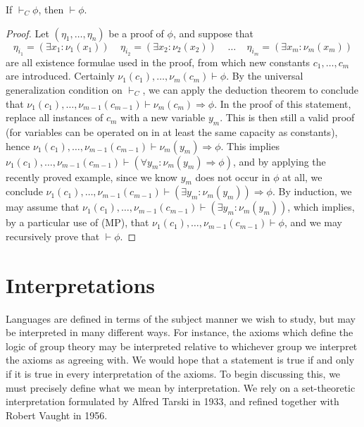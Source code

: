 \begin{theorem}
    If $\vdash_C \phi$, then $\vdash \phi$.
\end{theorem}
\begin{proof}
    Let $(\eta_1, \dots, \eta_n)$ be a proof of $\phi$, and suppose that
    \[ \eta_{i_1} = (\exists x_1: \nu_1(x_1))\ \ \ \ \ \eta_{i_2} = (\exists x_2: \nu_2(x_2))\ \ \ \ \ \dots\ \ \ \ \ \eta_{i_m} = (\exists x_m: \nu_m(x_m)) \]
    are all existence formulae used in the proof, from which new constants $c_1, \dots, c_m$ are introduced. Certainly $\nu_1(c_1), \dots, \nu_m(c_m) \vdash \phi$. By the universal generalization condition on $\vdash_C$, we can apply the deduction theorem to conclude that $\nu_1(c_1), \dots, \nu_{m-1}(c_{m-1}) \vdash \nu_m(c_m) \Rightarrow \phi$. In the proof of this statement, replace all instances of $c_m$ with a new variable $y_m$. This is then still a valid proof (for variables can be operated on in at least the same capacity as constants), hence $\nu_1(c_1), \dots, \nu_{m-1}(c_{m-1}) \vdash \nu_m(y_m) \Rightarrow \phi$. This implies $\nu_1(c_1), \dots, \nu_{m-1}(c_{m-1}) \vdash (\forall y_m: \nu_m(y_m) \Rightarrow \phi)$, and by applying the recently proved example, since we know $y_m$ does not occur in $\phi$ at all, we conclude $\nu_1(c_1), \dots, \nu_{m-1}(c_{m-1}) \vdash (\exists y_m: \nu_m(y_m)) \Rightarrow \phi$. By induction, we may assume that $\nu_1(c_1), \dots, \nu_{m-1}(c_{m-1}) \vdash (\exists y_m: \nu_m(y_m))$, which implies, by a particular use of (MP), that $\nu_1(c_1), \dots, \nu_{m-1}(c_{m-1}) \vdash \phi$, and we may recursively prove that $\vdash \phi$.
\end{proof}







\section{Interpretations}

Languages are defined in terms of the subject manner we wish to study, but may be interpreted in many different ways. For instance, the axioms which define the logic of group theory may be interpreted relative to whichever group we interpret the axioms as agreeing with. We would hope that a statement is true if and only if it is true in every interpretation of the axioms. To begin discussing this, we must precisely define what we mean by interpretation. We rely on a set-theoretic interpretation formulated by Alfred Tarski in 1933, and refined together with Robert Vaught in 1956.

